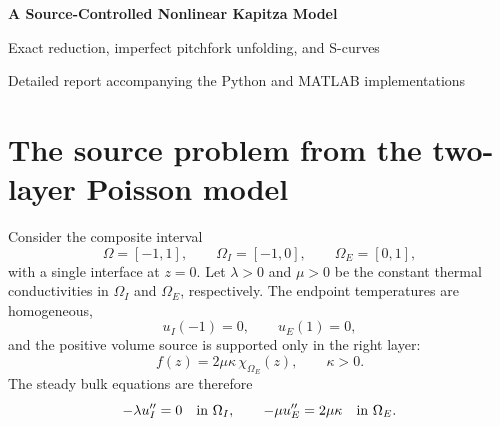 \documentclass[10pt,a4paper]{article}
\begin{document}
\begin{center}
  {\LARGE\bfseries\color{accent} A Source-Controlled Nonlinear Kapitza Model}\par\vspace{0.25em}
  {\Large Exact reduction, imperfect pitchfork unfolding, and S-curves}\par\vspace{0.6em}
  {\large Detailed report accompanying the Python and MATLAB implementations}
\end{center}

\begin{abstract}
This report develops a one-dimensional nonlinear Kapitza transmission model
in which the normalized strength \(\kappa\) of a positive volume heat source is
the bifurcation parameter. The underlying two-layer Poisson problem is the
one-dimensional non-uniqueness example in the recent work of Bejaoui, Ben
Belgacem, Jelassi, and Ma. Eliminating the two piecewise temperature fields
gives the jump relation
\(s=[u]=\kappa-(1+\delta)a\), where
\(\delta=\lambda/\mu\) is the ratio of the bulk conductivities. A specifically
constructed exponential contact conductance makes the scalar equilibrium
equation exactly equivalent to
\(x=\tanh(\kappa x+h)\). Consequently, the symmetric problem undergoes a
supercritical pitchfork at the critical source strength \(\kappa_c=1\).
Positive and negative biases unfold the pitchfork, the saddle-node trajectory
is analytic, and its local displacement satisfies a two-thirds power law.
The report also reconstructs the physical temperature fields, distinguishes
Picard-iteration stability from physical time-dependent stability, and
documents matching single-file Python and MATLAB implementations.
\end{abstract}

\tableofcontents

\section{The source problem from the two-layer Poisson model}

Consider the composite interval
\begin{equation}
  \Omega=[-1,1],\qquad
  \Omega_I=[-1,0],\qquad
  \Omega_E=[0,1],
\end{equation}
with a single interface at \(z=0\). Let \(\lambda>0\) and \(\mu>0\) be the
constant thermal conductivities in \(\Omega_I\) and \(\Omega_E\), respectively.
The endpoint temperatures are homogeneous,
\begin{equation}
  u_I(-1)=0,\qquad u_E(1)=0,
\end{equation}
and the positive volume source is supported only in the right layer:
\begin{equation}
  f(z)=2\mu\kappa\,\chi_{\Omega_E}(z),
  \qquad \kappa>0.
  \label{eq:source}
\end{equation}
The steady bulk equations are therefore
\begin{equation}
  -\lambda u_I''=0 \quad\hbox{in }\Omega_I,
  \qquad
  -\mu u_E''=2\mu\kappa \quad\hbox{in }\Omega_E.
  \label{eq:pde}
\end{equation}
\end{document}
